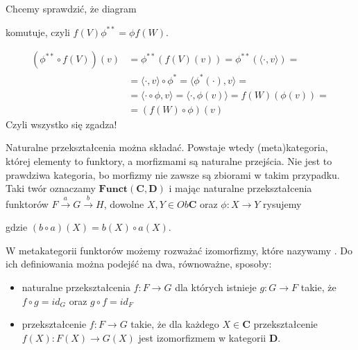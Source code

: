 \begin{example}
  Chcemy sprawdzić, że diagram
  \begin{center}
  \end{center}
  komutuje, czyli $f(V)\phi^{**}=\phi f(W)$.

  \begin{align*}
    (\phi^{**}\circ f(V))(v)&=\phi^{**}(f(V)(v))=\phi^{**}(\langle\cdot,v\rangle)=\\
                            &=\langle\cdot,v\rangle\circ\phi^*=\langle\phi^*(\cdot),v\rangle=\\
                            &=\langle \cdot\circ\phi,v\rangle=\langle\cdot,\phi(v)\rangle=f(W)(\phi(v))=\\
                            &=(f(W)\circ\phi)(v)
  \end{align*}
  Czyli wszystko się zgadza!
\end{example}

Naturalne przekształcenia można składać. Powstaje wtedy (meta)kategoria, której elementy to funktory, a morfizmami są naturalne przejścia. Nie jest to prawdziwa kategoria, bo morfizmy nie zawsze są zbiorami w takim przypadku. Taki twór oznaczamy $\mathbf{Funct}(\mathbf{C},\mathbf{D})$ i mając naturalne przekształcenia funktorów $F\overset{a}{\to} G\overset{b}{\to}H$, dowolne $X,Y\in Ob\mathbf{C}$ oraz $\phi:X\to Y$ rysujemy
\begin{center}
\end{center}
gdzie $(b\circ a)(X)=b(X)\circ a(X)$.

\begin{definition}
  W metakategorii funktorów możemy rozważać izomorfizmy, które nazywamy . Do ich definiowania można podejść na dwa, równoważne, sposoby:
  \begin{itemize}
    \item naturalne przekształcenia $f:F\to G$ dla których istnieje $g:G\to F$ takie, że $f\circ g=id_G$ oraz $g\circ f=id_F$
    \item przekształcenie $f:F\to G$ takie, że dla każdego $X\in\mathbf{C}$ przekształcenie $f(X):F(X)\to G(X)$ jest izomorfizmem w kategorii $\mathbf{D}$.
  \end{itemize}
\end{definition}

